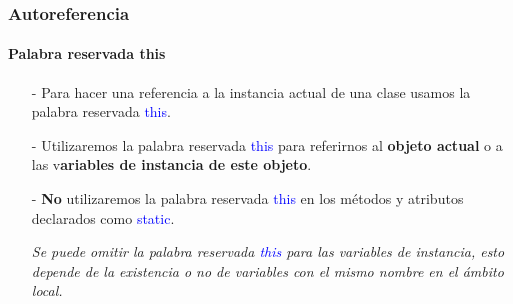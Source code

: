 \documentclass{beamer}
\begin{document}
        \begin{frame}
			\frametitle{Autoreferencia}
			\framesubtitle{Palabra reservada this}

			\begin{block}{}
			    {\scriptsize
                    \begin{itemize}
                        \item[-] Para hacer una referencia a la instancia actual de una clase usamos la palabra reservada \textcolor{blue}{this}.
                        \item[-] Utilizaremos la palabra reservada \textcolor{blue}{this} para referirnos al \textbf{objeto actual} o a las v\textbf{ariables de instancia de este objeto}. 
                        \item[-] \textbf{No} utilizaremos la palabra reservada \textcolor{blue}{this} en los m\'etodos y atributos declarados como \textcolor{blue}{static}.
                    \end{itemize}
			    }
			\end{block}	
			
			\begin{block}{}
			    {\scriptsize
                    \begin{itemize}
                        \item[] \emph{Se puede omitir la palabra reservada \textcolor{blue}{this} para las variables de instancia, esto depende de la existencia o no de variables con el mismo nombre en el \'ambito local.}
                    \end{itemize}
			    }
			\end{block}
		\end{frame}
\end{document}

